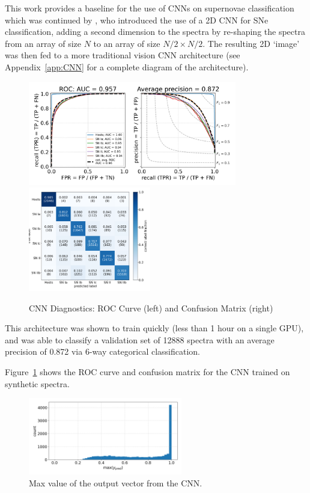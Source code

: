 This work provides a baseline for the use of CNNs on supernovae classification 
which was continued by \textcite{Sepeku2022}, who introduced the use of a
2D CNN for SNe classification, adding a second dimension to the spectra by
re-shaping the spectra from an array of size $N$ to an array of size $N/2\times N/2$. 
The resulting 2D `image' was then fed to a more traditional vision 
CNN architecture (see Appendix~\ref{app:CNN} for a complete diagram of the architecture). 
\begin{figure}[t]
    \centering
    \includegraphics[height=4.55cm]{figures/cnn/cnn_rocfull.png}
    \quad
    \includegraphics[height=4.55cm]{figures/cnn/cnn_cmfull.png}
    \caption[CNN diagnostics]{CNN Diagnostics: ROC Curve (left) and Confusion Matrix (right)\label{fig:cnn_qual}}
\end{figure}
This architecture was shown to train quickly (less than 1 hour on a single GPU), 
and was able to classify a validation set of 12888 spectra with an average precision of 0.872
via 6-way categorical classification. 

Figure~\ref{fig:cnn_qual} shows the ROC curve and confusion matrix for the 
CNN trained on synthetic spectra. 
\begin{figure}[t]
    \centering
    \includegraphics[width=0.6\textwidth]{figures/cnn/cnn_max_ypred.png}
    \caption[CNN's Confidence in Classification]{Max value of the output vector from the CNN.\label{fig:cnn_max}}
\end{figure}


